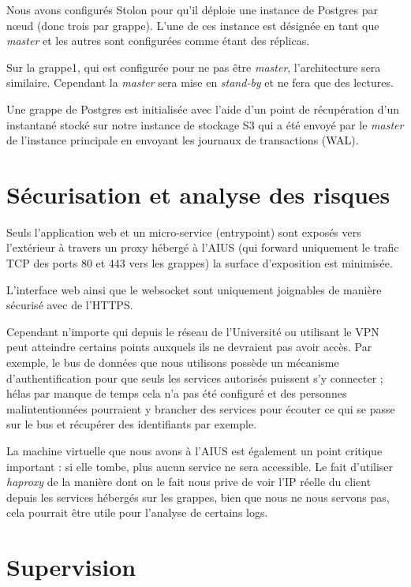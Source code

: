 Nous avons configurés Stolon pour qu'il déploie une instance de Postgres
par nœud (donc trois par grappe). L'une de ces instance est désignée en
tant que \textit{master} et les autres sont configurées comme étant des
réplicas.

Sur la grappe1, qui est configurée pour ne pas être \textit{master},
l'architecture sera similaire. Cependant la \textit{master} sera mise en
\textit{stand-by} et ne fera que des lectures.

Une grappe de Postgres est initialisée avec l'aide d'un point de
récupération d'un instantané stocké sur notre instance de stockage S3
qui a été envoyé par le \textit{master} de l'instance principale en
envoyant les journaux de transactions (WAL).

\section{Sécurisation et analyse des risques}

Seuls l'application web et un micro-service (entrypoint) sont exposés
vers l'extérieur à travers un proxy hébergé à l'AIUS (qui forward
uniquement le trafic TCP des ports 80 et 443 vers les grappes) la
surface d'exposition est minimisée.

L'interface web ainsi que le websocket sont uniquement joignables de
manière sécurisé avec de l'HTTPS.

Cependant n'importe qui depuis le réseau de l'Université ou utilisant le
VPN peut atteindre certains points auxquels ils ne devraient pas avoir
accès. Par exemple, le bus de données que nous utilisons possède un
mécanisme d'authentification pour que seuls les services autorisés
puissent s'y connecter ; hélas par manque de temps cela n'a pas été
configuré et des personnes malintentionnées pourraient y brancher des
services pour écouter ce qui se passe sur le bus et récupérer des
identifiants par exemple.

La machine virtuelle que nous avons à l'AIUS est également un point
critique important : si elle tombe, plus aucun service ne sera
accessible. Le fait d'utiliser \textit{haproxy} de la manière dont on le
fait nous prive de voir l'IP réelle du client depuis les services
hébergés sur les grappes, bien que nous ne nous servons pas, cela
pourrait être utile pour l'analyse de certains logs.

\section{Supervision}

